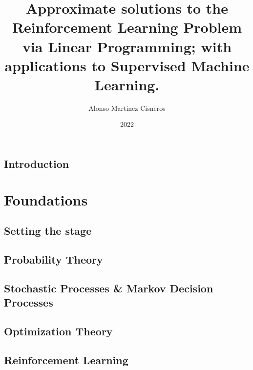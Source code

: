 \documentclass[colorful]{sty/itam-thesis}
\author{Alonso Martinez Cisneros}
\title{Approximate solutions to the Reinforcement Learning 
Problem via Linear Programming; with applications to Supervised 
Machine Learning.}
\date{2022}
\begin{document}
\frontmatter
{}
\maketitle
\makefrontmatter

\cleardoublepage




% 

\tableofcontents

\mainmatter


% 
\chapter*{Introduction}
% 

\part{Foundations}

\chapter{Setting the stage}
% 

\chapter{Probability Theory}

\chapter{Stochastic Processes \& Markov Decision Processes}
% 

\chapter{Optimization Theory}

\chapter{Reinforcement Learning}
% 
\end{document}
